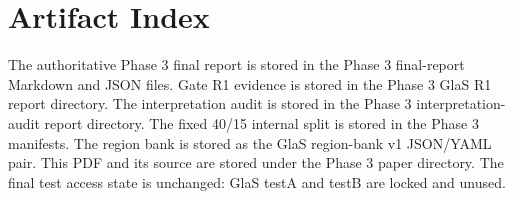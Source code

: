 \section*{Artifact Index}

The authoritative Phase 3 final report is stored in the Phase 3 final-report Markdown and JSON files. Gate R1 evidence is stored in the Phase 3 GlaS R1 report directory. The interpretation audit is stored in the Phase 3 interpretation-audit report directory. The fixed 40/15 internal split is stored in the Phase 3 manifests. The region bank is stored as the GlaS region-bank v1 JSON/YAML pair. This PDF and its source are stored under the Phase 3 paper directory. The final test access state is unchanged: GlaS testA and testB are locked and unused.
